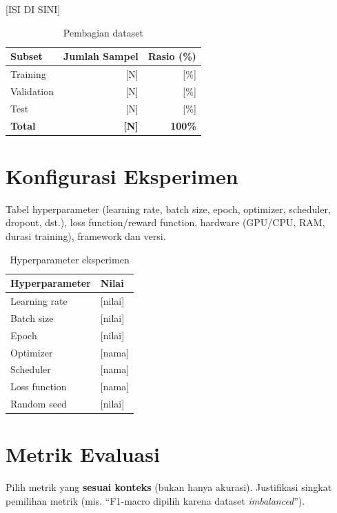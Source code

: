 \documentclass[11pt,a4paper,oneside]{report}
\begin{document}
[ISI DI SINI]

\begin{table}[h!]
\centering
\caption{Pembagian dataset}
\label{tab:split-data}
\begin{tabular}{lrr}
\toprule
\textbf{Subset} & \textbf{Jumlah Sampel} & \textbf{Rasio (\%)} \\
\midrule
Training   & [N] & [\%] \\
Validation & [N] & [\%] \\
Test       & [N] & [\%] \\
\midrule
\textbf{Total} & \textbf{[N]} & \textbf{100\%} \\
\bottomrule
\end{tabular}
\end{table}

\section{Konfigurasi Eksperimen}
\begin{petunjuk}
Tabel hyperparameter (learning rate, batch size, epoch, optimizer, scheduler, dropout, dst.), loss function/reward function, hardware (GPU/CPU, RAM, durasi training), framework dan versi.
\end{petunjuk}

\begin{table}[h!]
\centering
\caption{Hyperparameter eksperimen}
\label{tab:hyperparam}
\begin{tabular}{ll}
\toprule
\textbf{Hyperparameter} & \textbf{Nilai} \\
\midrule
Learning rate    & [nilai] \\
Batch size       & [nilai] \\
Epoch            & [nilai] \\
Optimizer        & [nama] \\
Scheduler        & [nama] \\
Loss function    & [nama] \\
Random seed      & [nilai] \\
\bottomrule
\end{tabular}
\end{table}

\section{Metrik Evaluasi}
\begin{petunjuk}
Pilih metrik yang \textbf{sesuai konteks} (bukan hanya akurasi). Justifikasi singkat pemilihan metrik (mis. ``F1-macro dipilih karena dataset \textit{imbalanced}'').
\end{petunjuk}
\end{document}
